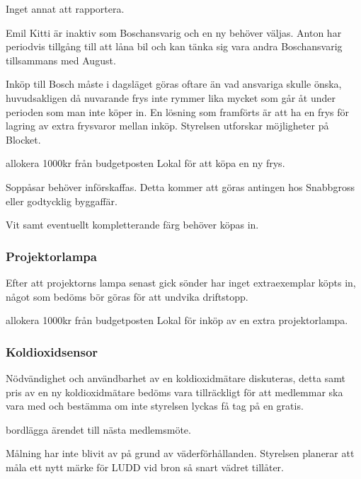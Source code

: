 \documentclass{protokoll}
\begin{document}
Inget annat att rapportera.

Emil Kitti är inaktiv som Boschansvarig och en ny behöver väljas. Anton har periodvis tillgång till att låna bil och kan tänka sig vara andra Boschansvarig tillsammans med August. 


Inköp till Bosch måste i dagsläget göras oftare än vad ansvariga skulle önska, huvudsakligen då nuvarande frys inte rymmer lika mycket som går åt under perioden som man inte köper in. En lösning som framförts är att ha en frys för lagring av extra frysvaror mellan inköp. Styrelsen utforskar möjligheter på Blocket. 
\begin{beslut}
    \att allokera 1000kr från budgetposten Lokal för att köpa en ny frys.
\end{beslut}

Soppåsar behöver införskaffas. Detta kommer att göras antingen hos Snabbgross eller godtycklig byggaffär.

Vit samt eventuellt kompletterande färg behöver köpas in. 


\subsubsection{Projektorlampa}
Efter att projektorns lampa senast gick sönder har inget extraexemplar köpts in, något som bedöms bör göras för att undvika driftstopp. 
\begin{beslut}
    \att allokera 1000kr från budgetposten Lokal för inköp av en extra projektorlampa.
\end{beslut}

\subsubsection{Koldioxidsensor}
Nödvändighet och användbarhet av en koldioxidmätare diskuteras, detta samt pris av en ny koldioxidmätare bedöms vara tillräckligt för att medlemmar ska vara med och bestämma om inte styrelsen lyckas få tag på en gratis. 
\begin{beslut}
    \att bordlägga ärendet till nästa medlemsmöte.
\end{beslut}

Målning har inte blivit av på grund av väderförhållanden. Styrelsen planerar att måla ett nytt märke för LUDD vid bron så snart vädret tillåter.
\end{document}
